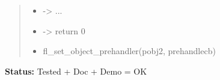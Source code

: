 \begin{boxedminipage}{\funcwidth}
\begin{quote}
\begin{itemize}
  \item {\textbar}-{\textgreater}{\textbar} ...



  \item {\textbar}-{\textgreater}{\textbar} return 0



  \item fl\_set\_object\_prehandler(pobj2, prehandlecb)



\end{itemize}

\end{quote}

\textbf{Status:} Tested + Doc + Demo = OK



    \end{boxedminipage}

    \label{xformslib:flbasic:fl_set_object_posthandler}

    \vspace{0.5ex}

